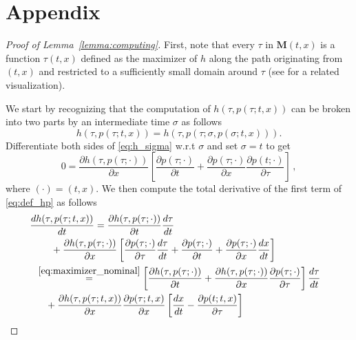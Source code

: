 \documentclass[10pt,conference]{ieeeconf}
\renewcommand{\(}{\left(}
\renewcommand{\)}{\right)}
\renewcommand{\[}{\left[}
\renewcommand{\]}{\right]}
\newcommand{\regularversion}[1]{\iffalse{}#1\fi}
\newcommand{\extendedversion}[1]{{\color{black}#1}}
\begin{document}
\section{Appendix} 
\regularversion{\allowdisplaybreaks}
\begin{proof}[Proof of Lemma~\ref{lemma:computing}]
First, note that every $\tau$ in $\boldsymbol{M}(t,x)$ is a function $\tau(t,x)$ defined as the maximizer of $h$ along the path originating from $(t,x)$ and restricted to a sufficiently small domain around $\tau$ (see \cite[Fig. 2]{Automatica} for a related visualization). 

We start by recognizing that the computation of $h(\tau,p(\tau;t,x))$ can be broken into two parts by an intermediate time $\sigma$ as follows
\begin{equation}
    h(\tau, p(\tau; t,x)) = h(\tau, p(\tau; \sigma, p(\sigma; t,x))) . \label{eq:h_sigma}
\end{equation}
Differentiate both sides of \eqref{eq:h_sigma} w.r.t $\sigma$ and set $\sigma = t$ to get
\begin{equation}
    0 = \frac{\partial h(\tau, p(\tau; \cdot))}{\partial x}\left[ \frac{\partial p(\tau; \cdot)}{\partial t} + \frac{\partial p(\tau; \cdot)}{\partial x} \frac{\partial p(t;\cdot)}{\partial \tau} \right] \,,  \label{eq:maximizer_nominal}
\end{equation}
where $(\cdot) = (t,x)$. 
%
We then compute the total derivative of the first term of \eqref{eq:def_hp} as\regularversion{{\cite{extended_version}}}
\extendedversion{follows
\begin{align}
    & \hspace{-8pt}\frac{d h(\tau, p(\tau; t,x))}{dt} = \frac{\partial h(\tau,p(\tau;\cdot))}{\partial t} \frac{d \tau}{d t} \nonumber \\ &\;\;\;\;\; + \frac{\partial h(\tau,p(\tau;\cdot))}{\partial x}\left[ \frac{\partial p(\tau;\cdot)}{\partial \tau}\frac{d \tau}{dt} + \frac{\partial p(\tau;\cdot)}{\partial t} + \frac{\partial p(\tau;\cdot)}{\partial x}\frac{dx}{dt}\right] \nonumber \\
 	&\hspace{-2pt}\overset{\eqref{eq:maximizer_nominal}}{=} \left[ \frac{\partial h(\tau,p(\tau;\cdot))}{\partial t} + \frac{\partial h(\tau,p(\tau;\cdot))}{\partial x}\frac{\partial p(\tau;\cdot)}{\partial \tau} \right] \frac{d \tau}{dt} \nonumber \\ &\;\;\; + \frac{\partial h(\tau,p(\tau;t,x))}{\partial x}\frac{\partial p(\tau;t,x)}{\partial x}\left[ \frac{dx}{dt} - \frac{\partial p(t;t,x)}{\partial \tau} \right] \nonumber \\

\end{align}}
\end{proof}
\end{document}
